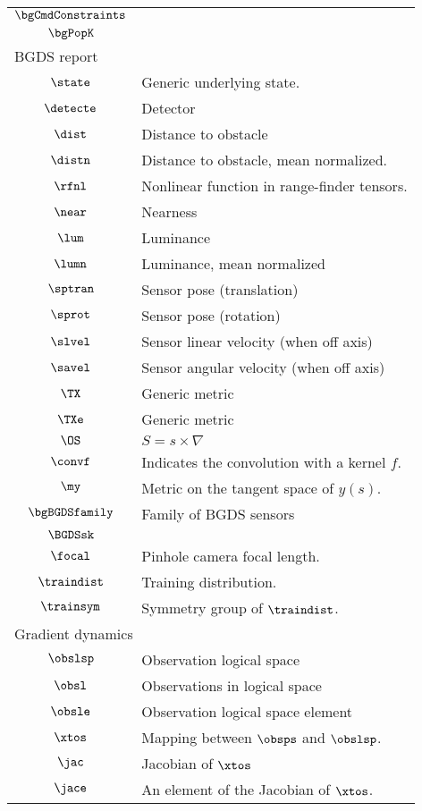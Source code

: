 \begin{longtable}{cl}
 $\bgCmdConstraints$ & \\ 
 $\bgPopK$ & \\ 
 \multicolumn{2}{l}{BGDS report}\\ 
 \hline
$\state$ &  Generic underlying state.\\ 
 $\detecte$ &  Detector\\ 
 $\dist$ &  Distance to obstacle\\ 
 $\distn$ &  Distance to obstacle, mean normalized.\\ 
 $\rfnl$ &  Nonlinear function in range-finder tensors.\\ 
 $\near$ &  Nearness\\ 
 $\lum$ &  Luminance\\ 
 $\lumn$ &  Luminance, mean normalized\\ 
 $\sptran$ &  Sensor pose (translation)\\ 
 $\sprot$ &  Sensor pose (rotation)\\ 
 $\slvel$ &  Sensor linear velocity (when off axis)\\ 
 $\savel$ &  Sensor angular velocity (when off axis)\\ 
 $\TX$ &  Generic metric\\ 
 $\TXe$ &  Generic metric\\ 
 $\OS$ &  $S = s\times \nabla$\\ 
 $\convf$ &  Indicates the convolution with a kernel $f$.\\ 
 $\my$ &  Metric on the tangent space of $y(s)$.\\ 
 $\bgBGDSfamily$ &  Family of BGDS sensors\\ 
 $\BGDSsk$ & \\ 
 $\focal$ &  Pinhole camera focal length.\\ 
 $\traindist$ &  Training distribution.\\ 
 $\trainsym$ &  Symmetry group of $\traindist$.\\ 
 \multicolumn{2}{l}{Gradient dynamics}\\ 
 \hline
$\obslsp$ &  Observation logical space\\ 
 $\obsl$ &  Observations in logical space\\ 
 $\obsle$ &  Observation logical space element\\ 
 $\xtos$ &  Mapping between $\obsps$ and $\obslsp$.\\ 
 $\jac$ &  Jacobian of $\xtos$\\ 
 $\jace$ &  An element of the Jacobian of $\xtos$.\\ 

\end{longtable}
